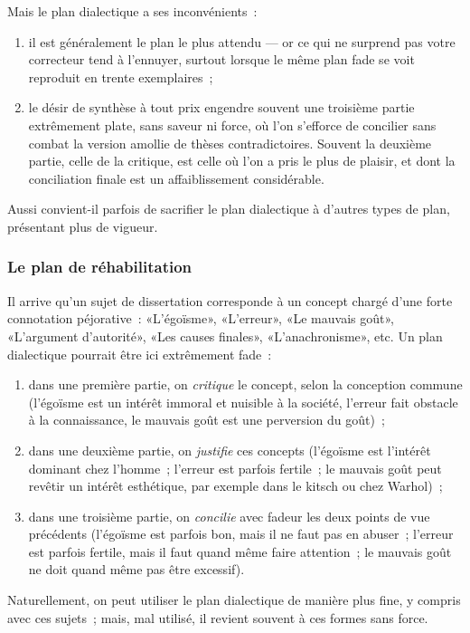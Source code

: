 \documentclass[a4paper,11pt]{article}
\begin{document}
Mais le plan dialectique a ses inconvénients~:
\begin{enumerate}
\item il est généralement le plan le plus attendu --- or ce qui ne
  surprend pas votre correcteur tend à l'ennuyer, surtout lorsque le
  même plan fade se voit reproduit en trente exemplaires~;
\item le désir de synthèse à tout prix engendre souvent une troisième
  partie extrêmement plate, sans saveur ni force, où l'on s'efforce de
  concilier sans combat la version amollie de thèses
  contradictoires. Souvent la deuxième partie, celle de la critique, est
  celle où l'on a pris le plus de plaisir, et dont la conciliation
  finale est un affaiblissement considérable.
\end{enumerate}

Aussi convient-il parfois de sacrifier le plan dialectique à d'autres
types de plan, présentant plus de vigueur.


\subsubsection{Le plan de réhabilitation}

Il arrive qu'un sujet de dissertation corresponde à un concept chargé
d'une forte connotation péjorative~: «L'égoïsme», «L'erreur», «Le
mauvais goût», «L'argument d'autorité», «Les causes finales»,
«L'anachronisme», etc. Un plan dialectique pourrait être ici extrêmement
fade~:
\begin{enumerate}
\item dans une première partie, on \emph{critique} le concept, selon la
  conception commune (l'égoïsme est un intérêt immoral et nuisible à la
  société, l'erreur fait obstacle à la connaissance, le mauvais goût est
  une perversion du goût)~;
\item dans une deuxième partie, on \emph{justifie} ces concepts
  (l'égoïsme est l'intérêt dominant chez l'homme~; l'erreur est parfois
  fertile~; le mauvais goût peut revêtir un intérêt esthétique, par
  exemple dans le kitsch ou chez Warhol)~;
\item dans une troisième partie, on \emph{concilie} avec fadeur les deux
  points de vue précédents (l'égoïsme est parfois bon, mais il ne faut
  pas en abuser~; l'erreur est parfois fertile, mais il faut quand même
  faire attention~; le mauvais goût ne doit quand même pas être
  excessif).
\end{enumerate}

Naturellement, on peut utiliser le plan dialectique de manière plus
fine, y compris avec ces sujets~; mais, mal utilisé, il revient souvent
à ces formes sans force.
\end{document}
